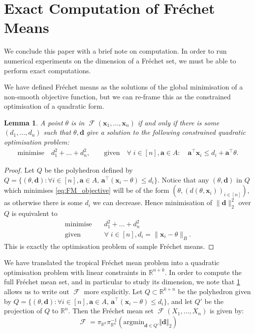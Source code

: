 \documentclass[10pt]{article}
\newtheorem{lemma}[theorem]{Lemma}
\theoremstyle{definition}
\theoremstyle{remark}
\newcommand{\R}{\mathbb{R}}
\newcommand{\T}{\intercal}
\newcommand{\argmin}{\text{argmin}}
\newcommand{\norm}[2]{\Vert #2 \Vert_{#1}}
\newcommand{\sample}{ X_1,\dots, X_n}
\DeclareMathOperator{\FMset}{\mathcal{F}}
\renewcommand{\vec}[1]{\mathbf{#1}}
\begin{document}
	\section{Exact Computation of Fr\'echet Means} \label{sec:computation}
	
	We conclude this paper with a brief note on computation. In order to run numerical experiments on the dimension of a Fr\'echet set, we must be able to perform exact computations.
	
	We have defined Fr\'echet means as the solutions of the global minimisation of a non-smooth objective function, but we can re-frame this as the constrained optimisation of a quadratic form.
	
	\begin{lemma}\label{lem:constrained_quadratic_optimisation}
		A point $\theta$ is in $\FMset(\vec x_1,\dots, \vec x_n)$ if and only if there is some $(d_1, \dots, d_n)$ such that $\theta, \vec d$ give a solution to the following constrained quadratic optimisation problem: 
		\begin{align} \label{eq:FM_objective}
			\text{minimise}\quad d_1^2+\dots+d_n^2, \qquad \text{given} \quad \forall \;  i \in [n], \vec a \in A: \quad \vec a^{\T}\vec x_i \leq d_i +\vec a^{\T}\theta.
		\end{align}    
	\end{lemma}
	\begin{proof}
		Let $Q$ be the polyhedron defined by $Q = \{(\theta, \vec d) : \forall i \in [n], \vec a \in A , \, \vec a^\T(\vec x_i - \theta) \leq d_i \}$. Notice that any $(\theta, \vec d)$ in $Q$ which minimises \cref{eq:FM_objective} will be of the form $(\theta, (d(\theta,\vec x_i))_{i \in [n]})$, as otherwise there is some $d_i$ we can decrease. Hence minimisation of $\|\vec d\|_2^2$ over $Q$ is equivalent to
		\begin{align*}
			\text{minimise}&\quad d_1^2+\dots+d_n^2\\
			\text{given} &\quad \forall \;  i \in [n], d_i = \|\vec x_i - \theta\|_B.
		\end{align*}
		This is exactly the optimisation problem of sample Fr\'echet means.
	\end{proof}
	We have translated the tropical Fr\'echet mean problem into a quadratic optimisation problem with linear constraints in $\R^{n+k}$. In order to compute the full Fr\'echet mean set, and in particular to study its dimension, we note that \cref{lem:constrained_quadratic_optimisation} allows us to write out $\FMset$ more explicitly. Let $Q \subset \R^{k+n}$ be the polyhedron given by $Q = \{(\theta, \vec d) : \forall i \in [n], \vec a \in A , \, \vec a^\T(\vec x_i - \theta) \leq d_i \}$, and let $Q'$ be the projection of $Q$ to $\R^n$. Then the Fr\'echet mean set $\FMset(\sample)$ is given by: 
	\[
	\FMset = \pi_{\R^k}\pi^{-1}_{\R^n}(\argmin_{\vec d \in Q'} \norm{2}{\vec d})
	\]
	
\end{document}
